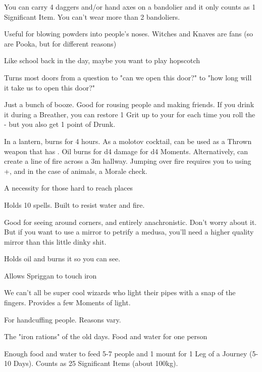 {\begin{multicols}{2}
   You can carry 4 daggers and/or hand axes on a bandolier and it only counts as 1 Significant Item. You can't wear more than 2 bandoliers.
  
   Useful for blowing powders into people's noses.  Witches and Knaves are fans (so are Pooka, but for different reasons)
  
   Like school back in the day, maybe you want to play hopscotch
  
   Turns most doors from a question to "can we open this door?" to "how long will it take us to open this door?"
  
   Just a bunch of booze. Good for rousing people and making friends. If you drink it during a Breather, you can restore 1 Grit up to your \MAX for each time you roll the \UD - but you also get 1 point of Drunk.
  
   In a lantern, burns for 4 hours. As a molotov cocktail, can be used as a Thrown weapon that has  .  Oil burns for d4 damage for d4 Moments. Alternatively, can create a line of fire across a 3m hallway. Jumping over fire requires you to \RO using \MD+\DEX, and in the case of animals, a Morale check. 
  
   A necessity for those hard to reach places
  
   Holds 10 spells. Built to resist water and fire.
  
   Good for seeing around corners, and entirely anachronistic. Don't worry about it. But if you want to use a mirror to petrify a medusa,  you'll need a higher quality mirror than this little dinky shit.
  
   Holds oil and burns it so you can see.
  
   Allows Spriggan to touch iron
  
   We can't all be super cool wizards who light their pipes with a snap of the fingers.  Provides a few Moments of light.
  
   For handcuffing people.  Reasons vary.
  
   The "iron rations" of the old days.  Food and water for one person

  \cbreak
  
   Enough food and water to feed 5-7 people and 1 mount for 1 Leg of a Journey (5-10 Days).  Counts as 25 Significant Items (about 100kg).
  

\end{multicols}}
